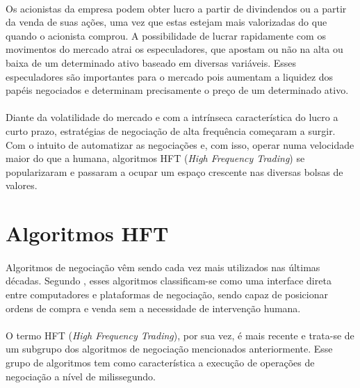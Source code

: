 \documentclass[grad,numbers]{coppe}
\begin{document}
        \paragraph{}Os acionistas da empresa podem obter lucro a partir de divindendos ou a partir da venda de suas ações, uma vez que estas estejam mais valorizadas do que quando o acionista comprou. A possibilidade de lucrar rapidamente com os movimentos do mercado atrai os especuladores, que apostam ou não na alta ou baixa de um determinado ativo baseado em diversas variáveis. Esses especuladores são importantes para o mercado pois aumentam a liquidez dos papéis negociados e determinam precisamente o preço de um determinado ativo.
        
        \paragraph{}Diante da volatilidade do mercado e com a intrínseca característica do lucro a curto prazo, estratégias de negociação de alta frequência começaram a surgir. Com o intuito de automatizar as negociações e, com isso, operar numa velocidade maior do que a humana, algoritmos HFT (\textit{High Frequency Trading}) se popularizaram e passaram a ocupar um espaço crescente nas diversas bolsas de valores.
        
    \section{Algoritmos HFT}
        
        \paragraph{}Algoritmos de negociação vêm sendo cada vez mais utilizados nas últimas décadas. Segundo \citet{chaboud-hft}, esses algoritmos classificam-se como uma interface direta entre computadores e plataformas de negociação, sendo capaz de posicionar ordens de compra e venda sem a necessidade de intervenção humana.
        
        \paragraph{}O termo HFT (\textit{High Frequency Trading}), por sua vez, é mais recente e trata-se de um subgrupo dos algoritmos de negociação mencionados anteriormente. Esse grupo de algoritmos tem como característica a execução de operações de negociação a nível de milissegundo.
        
\end{document}
